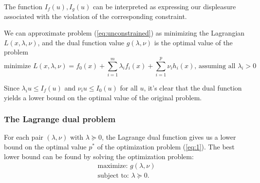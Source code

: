 \documentclass{article}
\newcommand{\R}{{\mathbb{R}}}
\begin{document}
The function $I_f(u), I_g(u)$ can be interpreted as expressing our displeasure associated with the violation of the corresponding constraint.

We can approximate problem (\ref{eq:unconstrained}) as minimizing the Lagrangian $L(x, \lambda, \nu)$, and the dual function value $g(\lambda, \nu)$ is the optimal value of the problem
\begin{equation} \label{eq:Lagrangian}
\textrm{minimize } L(x,\lambda,\nu)  = f_0(x) + \sum_{i=1}^m \lambda_i f_i(x) + \sum_{i=1}^p \nu_i h_i(x) 
\textrm{, assuming all } \lambda_i > 0
\end{equation}

Since $\lambda_i u \le I_f(u)$ and $\nu_i u \le I_0(u)$ for all $u$, it's clear that the dual function yields a lower bound on the optimal value of the original problem. 







\subsubsection{The Lagrange dual problem}

For each pair $(\lambda, \nu)$ with $\lambda \succeq 0$, the Lagrange dual function gives us a lower bound on the optimal value $p^*$ of the optimization problem (\ref{eq:1}). The best lower bound can be found by solving the optimization problem:
\begin{equation} \label{eq:dual}
\begin{array}{l}
\textrm{maximize: } g(\lambda, \nu)\\
\textrm{subject to: } \lambda \succeq 0.
\end{array}
\end{equation}
\end{document}
